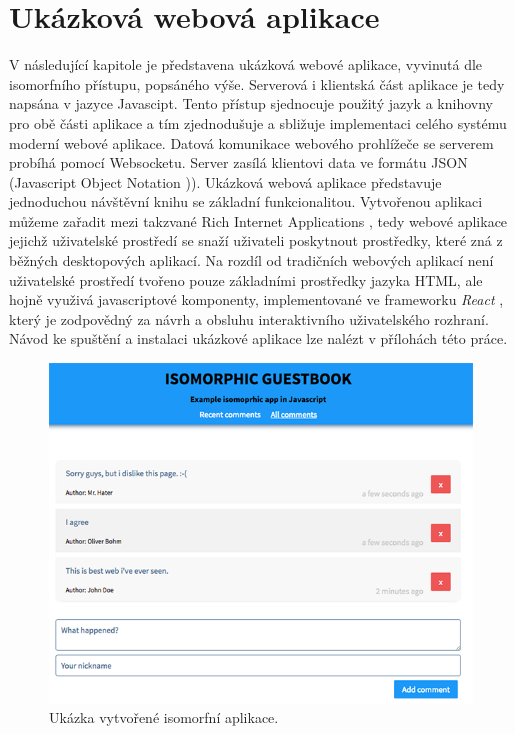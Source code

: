 \chapter{Ukázková webová aplikace}
V následující kapitole je představena ukázková webové aplikace, vyvinutá dle isomorfního přístupu, popsáného výše. Serverová i klientská část aplikace je tedy napsána v jazyce Javascipt. Tento přístup sjednocuje použitý jazyk a knihovny pro obě části aplikace a tím zjednodušuje a sbližuje implementaci celého systému moderní webové aplikace. Datová komunikace webového prohlížeče se serverem probíhá pomocí Websocketu. Server zasílá klientovi data ve formátu JSON (Javascript Object Notation \cite{json})). Ukázková webová aplikace představuje jednoduchou návštěvní knihu se základní funkcionalitou. Vytvořenou aplikaci můžeme zařadit mezi takzvané Rich Internet Applications \cite{ria}, tedy webové aplikace jejichž uživatelské prostředí se snaží uživateli poskytnout prostředky, které zná z běžných desktopových aplikací. Na rozdíl od tradičních webových aplikací není uživatelské prostředí tvořeno pouze základními prostředky jazyka HTML, ale hojně využivá javascriptové komponenty, implementované ve frameworku \textit{React} \cite{react}, který je zodpovědný za návrh a obsluhu interaktivního uživatelského rozhraní. Návod ke spuštění a instalaci ukázkové aplikace lze nalézt v přílohách této práce.

\vspace{3mm}
\begin{figure}[h]
\begin{centering}
\includegraphics[scale=0.45]{obrazky/example_app}
\par\end{centering}
\caption{Ukázka vytvořené isomorfní aplikace.\label{fig:webpack}}
\end{figure}
\FloatBarrier

